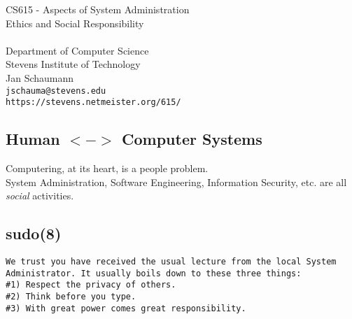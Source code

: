 \documentclass[xga]{xdvislides}
\begin{document}
\setfontphv

\lhead{\slidetitle}                               %
\cfoot{\relax}                               %
\rfoot{\Gray{\today}}

\vspace*{\fill}
\begin{center}
	\Hugesize
		CS615 - Aspects of System Administration\\ [1em]
		Ethics and Social Responsibility\\ [1em]
	\hspace*{5mm}\blueline\\ [1em]
	\Normalsize
		Department of Computer Science\\
		Stevens Institute of Technology\\
		Jan Schaumann\\
		\verb+jschauma@stevens.edu+\\
		\verb+https://stevens.netmeister.org/615/+
\end{center}
\vspace*{\fill}

\subsection{Human $<->$ Computer Systems}
\vspace*{\fill}
\Huge
\begin{center}
Computering, at its heart, is a people problem. \\
\vspace{.5in}
System Administration, Software Engineering,
Information Security, etc. are all {\em social}
activities.
\end{center}
\Normalsize
\vspace*{\fill}

\subsection{sudo(8)}
\vspace*{\fill}
\begin{verbatim}
We trust you have received the usual lecture from the local System
Administrator. It usually boils down to these three things:
#1) Respect the privacy of others.
#2) Think before you type.
#3) With great power comes great responsibility.
\end{verbatim}
\vspace*{\fill}
\end{document}

